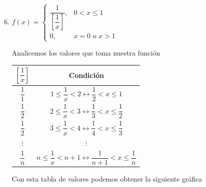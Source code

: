 \documentclass{report}
\begin{document}
\begin{enumerate}[label=\textcolor{NavyBlue}{\textbf{\arabic*.}}]
\begin{enumerate}[label=\textcolor{NavyBlue}{\textbf{\roman*.}}]
                \setcounter{enumii}{5}
                \item $f(x) = \begin{cases}
                    \dfrac{1}{\left[\dfrac{1}{x}\right]}, & 0 < x \leq 1\\
                    0, & x=0 \text{ o } x > 1
                \end{cases}$

                Analicemos los valores que toma nuestra función

                \begin{table}[H]
                    \setlength{\extrarowheight}{20pt}
                    \centering
                    \begin{adjustbox}{valign=c}
                    \begin{tabular}{|c|c|}
                        \hline
                        $\left[\dfrac{1}{x}\right]$ & Condición                           \\ \hline
                        $\dfrac{1}{1}$              & $1 \leq \dfrac{1}{x} < 2 \leftrightarrow \dfrac{1}{2} < x \leq 1$               \\ \hline
                        $\dfrac{1}{2}$              & $2 \leq \dfrac{1}{x} < 3 \leftrightarrow \dfrac{1}{3} < x \leq \dfrac{1}{2}$     \\ \hline
                        $\dfrac{1}{2}$              & $3 \leq \dfrac{1}{x} < 4 \leftrightarrow \dfrac{1}{4} < x \leq \dfrac{1}{3}$     \\ \hline
                        $\vdots$                    & $\vdots$                                                                       \\ \hline
                        $\dfrac{1}{n}$                & $n \leq \dfrac{1}{x} < n+1 \leftrightarrow \dfrac{1}{n+1} < x \leq \dfrac{1}{n}$ \\ \hline
                    \end{tabular}
                \end{adjustbox}
                \end{table}

                Con esta tabla de valores podemos obtener la siguiente gráfica\\
                \begin{center}
                \end{center}


\end{enumerate}
\end{enumerate}
\end{document}
